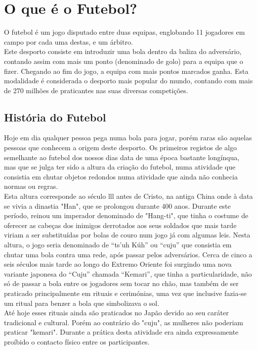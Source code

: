 \documentclass[a4paper,12pt]{report}
\begin{document}
\clearpage
{}

\chapter{O que é o Futebol?}
\label{chap.o que é o Futebol}

O futebol é um jogo disputado entre duas equipas, englobando 11 jogadores em campo por cada uma destas, e um árbitro. \\
Este desporto consiste em introduzir uma bola dentro da baliza do adversário, contando assim com mais um ponto (denominado de golo) para a equipa que o fizer. Chegando ao fim do jogo, a equipa com mais pontos marcados ganha.
Esta modalidade é considerada o desporto mais popular do mundo, contando com mais de 270 milhões de praticantes nas suas diversas competições.\\

\section{História do Futebol}
\label{História do Futebol}

Hoje em dia qualquer pessoa pega numa bola para jogar, porém raras são aquelas pessoas que conhecem a origem deste desporto. Os primeiros registos de algo semelhante ao futebol dos nossos dias data de uma época bastante longínqua, mas que se julga ter sido a altura da criação do futebol, numa atividade que consistia em chutar objetos redondos numa atividade que ainda não conhecia normas ou regras.\\ 
Esta altura corresponde ao século lll antes de Cristo, na antiga China onde à data se vivia a dinastia "Han", que se prolongou durante 400 anos. Durante este período, reinou um imperador denominado de "Hang-ti", que tinha o costume de oferecer as cabeças dos inimigos derrotados aos seus soldados que mais tarde viriam a ser substituídas por bolas de couro num jogo já com algumas leis. \newpage
Nesta altura, o jogo seria denominado de “ts'uh Kúh” ou “cuju” que consistia em chutar uma bola contra uma rede, após passar pelos adversários. Cerca de cinco a seis séculos mais tarde ao longo do Extremo Oriente foi surgindo uma nova variante japonesa do “Cuju” chamada “Kemari”, que tinha a particularidade, não só de passar a bola entre os jogadores sem tocar no chão, mas também de ser praticado principalmente em rituais e cerimónias, uma vez que inclusive fazia-se um ritual para benzer a bola que simbolizava o sol.\\
 Até hoje esses rituais ainda são praticados no Japão devido ao seu caráter tradicional e cultural. Porém ao contrário do "cuju", as mulheres não poderiam praticar "kemari". Durante a prática desta atividade era ainda expressamente proíbido o contacto físico entre os participantes.
 
\end{document}
